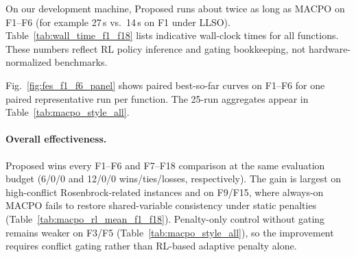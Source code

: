 \documentclass[conference]{IEEEtran}
\begin{document}
On our development machine, Proposed runs about twice as long as MACPO on F1--F6 (for example 27\,s vs.\ 14\,s on F1 under LLSO). Table~\ref{tab:wall_time_f1_f18} lists indicative wall-clock times for all functions. These numbers reflect RL policy inference and gating bookkeeping, not hardware-normalized benchmarks.

\begin{table}[htbp]
\centering
\tiny
\setlength{\tabcolsep}{2.8pt}
\caption{Indicative mean wall-clock time per run (\textbf{seconds}) on F1--F18, measured on our development hardware during the same 25-run batch as Table~\protect\ref{tab:macpo_rl_mean_f1_f18}. Values are for qualitative overhead comparison only.}
\label{tab:wall_time_f1_f18}
\end{table}

Fig.~\ref{fig:fes_f1_f6_panel} shows paired best-so-far curves on F1--F6 for one paired representative run per function. The 25-run aggregates appear in Table~\ref{tab:macpo_style_all}.

\paragraph{Overall effectiveness.} Proposed wins every F1--F6 and F7--F18 comparison at the same evaluation budget (6/0/0 and 12/0/0 wins/ties/losses, respectively). The gain is largest on high-conflict Rosenbrock-related instances and on F9/F15, where always-on MACPO fails to restore shared-variable consistency under static penalties (Table~\ref{tab:macpo_rl_mean_f1_f18}). Penalty-only control without gating remains weaker on F3/F5 (Table~\ref{tab:macpo_style_all}), so the improvement requires conflict gating rather than RL-based adaptive penalty alone.
\end{document}
